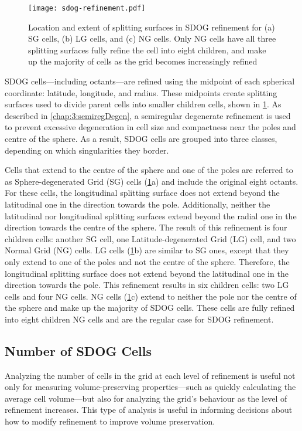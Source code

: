\begin{figure}[ht!]
	\centering
	\texttt{[image: sdog-refinement.pdf]}
	\caption[Splitting surfaces used in SDOG refinement]{
		Location and extent of splitting surfaces in SDOG refinement for (a) SG cells, (b) LG cells, and (c) NG cells.
		Only NG cells have all three splitting surfaces fully refine the cell into eight children, and make up the majority of cells as the grid becomes increasingly refined
	}
	\label{fig:sdog-refinement}
\end{figure}


SDOG cells---including octants---are refined using the midpoint of each spherical coordinate: latitude, longitude, and radius.
These midpoints create splitting surfaces used to divide parent cells into smaller children cells, shown in \cref{fig:sdog-refinement}.
As described in \cref{chap:3:semiregDegen}, a semiregular degenerate refinement is used to prevent excessive degeneration in cell size and compactness near the poles and centre of the sphere.
As a result, SDOG cells are grouped into three classes, depending on which singularities they border.


Cells that extend to the centre of the sphere and one of the poles are referred to as Sphere-degenerated Grid (SG) cells (\cref{fig:sdog-refinement}a) and include the original eight octants.
For these cells, the longitudinal splitting surface does not extend beyond the latitudinal one in the direction towards the pole.
Additionally, neither the latitudinal nor longitudinal splitting surfaces extend beyond the radial one in the direction towards the centre of the sphere.
The result of this refinement is four children cells: another SG cell, one Latitude-degenerated Grid (LG) cell, and two Normal Grid (NG) cells.
LG cells (\cref{fig:sdog-refinement}b) are similar to SG ones, except that they only extend to one of the poles and not the centre of the sphere.
Therefore, the longitudinal splitting surface does not extend beyond the latitudinal one in the direction towards the pole.
This refinement results in six children cells: two LG cells and four NG cells.
NG cells (\cref{fig:sdog-refinement}c) extend to neither the pole nor the centre of the sphere and make up the majority of SDOG cells.
These cells are fully refined into eight children NG cells and are the regular case for SDOG refinement.


\subsection{Number of SDOG Cells} \label{chap:4:numCells}
Analyzing the number of cells in the grid at each level of refinement is useful not only for measuring volume-preserving properties---such as quickly calculating the average cell volume---but also for analyzing the grid's behaviour as the level of refinement increases.
This type of analysis is useful in informing decisions about how to modify refinement to improve volume preservation.


